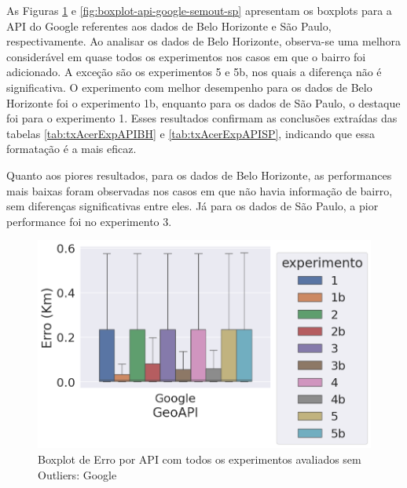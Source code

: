 As Figuras \ref{fig:boxplot-api-google-semout-bh} e \ref{fig:boxplot-api-google-semout-sp} apresentam os boxplots para a API do Google referentes aos dados de Belo Horizonte e São Paulo, respectivamente. Ao analisar os dados de Belo Horizonte, observa-se uma melhora considerável em quase todos os experimentos nos casos em que o bairro foi adicionado. A exceção são os experimentos 5 e 5b, nos quais a diferença não é significativa. O experimento com melhor desempenho para os dados de Belo Horizonte foi o experimento 1b, enquanto para os dados de São Paulo, o destaque foi para o experimento 1. Esses resultados confirmam as conclusões extraídas das tabelas \ref{tab:txAcerExpAPIBH} e \ref{tab:txAcerExpAPISP}, indicando que essa formatação é a mais eficaz.

Quanto aos piores resultados, para os dados de Belo Horizonte, as performances mais baixas foram observadas nos casos em que não havia informação de bairro, sem diferenças significativas entre eles. Já para os dados de São Paulo, a pior performance foi no experimento 3.


\begin{figure}[h]
    \centering
    \includegraphics[width=\textwidth]{Figuras/boxplotApiGoogleSemOut.png}
    \caption{Boxplot de Erro por API com todos os experimentos avaliados sem Outliers: Google}
    \label{fig:boxplot-api-google-semout-bh}
\end{figure}


